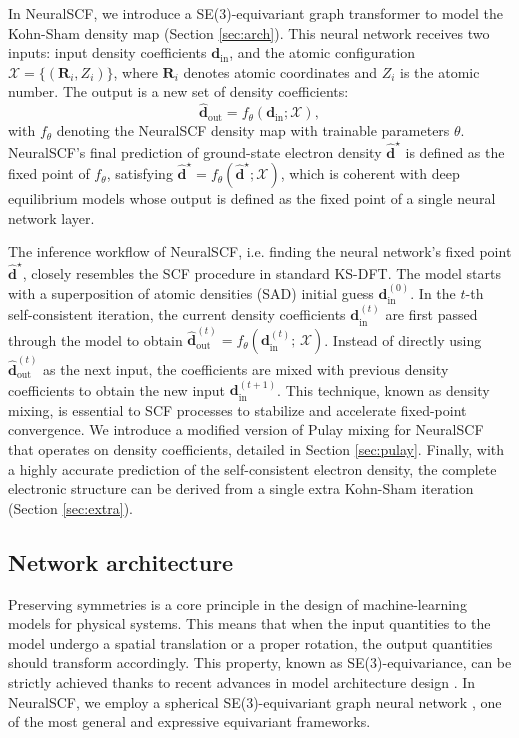 \documentclass[%
reprint,
superscriptaddress,
bibnotes,
amsmath,amssymb,
aps,
floatfix, %
]{revtex4-2}
\begin{document}
In NeuralSCF, we introduce a SE(3)-equivariant graph transformer to model the Kohn-Sham density map (Section \ref{sec:arch}). This neural network receives two inputs: input density coefficients \( \mathbf{d}_{\text{in}} \), and the atomic configuration \( \mathcal{X} = \{(\bm{R}_i, Z_i)\} \), where \( \bm{R}_i \) denotes atomic coordinates and \( Z_i \) is the atomic number. The output is a new set of density coefficients:
\begin{equation}
\hat{\mathbf{d}}_\text{out} = f_{\theta}(\mathbf{d}_\text{in};\mathcal{X}),
\end{equation}
with $f_{\theta}$ denoting the NeuralSCF density map with trainable parameters $\theta$. NeuralSCF's final prediction of ground-state electron density $\hat{\mathbf{d}}^\star$ is defined as the fixed point of $f_{\theta}$, satisfying $\hat{\mathbf{d}}^\star = f_{\theta}(\hat{\mathbf{d}}^\star; \mathcal{X})$, which is coherent with deep equilibrium models \cite{bai2019deq} whose output is defined as the fixed point of a single neural network layer.

The inference workflow of NeuralSCF, i.e. finding the neural network’s fixed point $\hat{\mathbf{d}}^\star$, closely resembles the SCF procedure in standard KS-DFT. The model starts with a superposition of atomic densities (SAD) \cite{lenthe2006start} initial guess $\mathbf{d}_\text{in}^{(0)}$. In the $t$-th self-consistent iteration, the current density coefficients $\mathbf{d}_\text{in}^{(t)}$ are first passed through the model to obtain $\hat{\mathbf{d}}_\text{out}^{(t)} = f_\theta(\mathbf{d}_\text{in}^{(t)}; \, \mathcal{X})$. Instead of directly using $\hat{\mathbf{d}}_\text{out}^{(t)}$ as the next input, the coefficients are mixed with previous density coefficients to obtain the new input $\mathbf{d}_\text{in}^{(t+1)}$. This technique, known as density mixing, is essential to SCF processes to stabilize and accelerate fixed-point convergence. We introduce a modified version of Pulay mixing for NeuralSCF that operates on density coefficients, detailed in Section \ref{sec:pulay}. Finally, with a highly accurate prediction of the self-consistent electron density, the complete electronic structure can be derived from a single extra Kohn-Sham iteration (Section \ref{sec:extra}).

\subsection{\label{sec:arch}Network architecture}

\noindent Preserving symmetries is a core principle in the design of machine-learning models for physical systems. This means that when the input quantities to the model undergo a spatial translation or a proper rotation, the output quantities should transform accordingly. This property, known as SE(3)-equivariance, can be strictly achieved thanks to recent advances in model architecture design \cite{duval2024hitchhikers}. In NeuralSCF, we employ a spherical SE(3)-equivariant graph neural network \cite{geiger2022e3nn}, one of the most general and expressive equivariant frameworks. 
\end{document}
